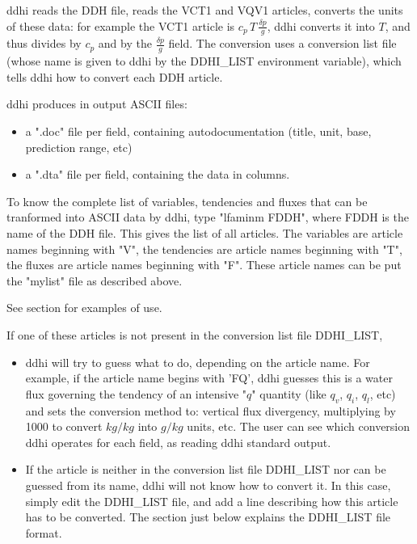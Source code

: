 \p ddhi reads the DDH file, reads the VCT1 and VQV1 articles, converts the units of these data:
for example the VCT1 article is $c_p \, T \, \frac{\delta p}{g}$, ddhi converts it into $T$, and thus divides 
by $c_p$ and by the $\frac{\delta p}{g}$ field. The conversion uses a conversion list file (whose name is given to 
ddhi by the DDHI\_LIST environment variable), which
tells ddhi how to convert each DDH article. 


\p ddhi produces in output ASCII files:
\begin{itemize}
  [label=\textbullet]
  \item a ".doc" file per field, containing autodocumentation (title, unit, base, prediction range, etc)
  \item a ".dta" file per field, containing the data in columns.
\end{itemize}

\p To know the complete list of variables, tendencies and fluxes that can be tranformed into ASCII data
by ddhi, type "lfaminm FDDH", where FDDH is the name of the DDH file.
This gives the list of all articles. The variables are article names beginning with "V",
the tendencies are article names beginning with "T", the fluxes are article names beginning with "F".
These article names can be put the "mylist" file as described above.

\p See section  for examples of use.

\p If one of these articles is not present in the conversion list file DDHI\_LIST, 
\begin{itemize}
  [label=\textbullet]
  \item ddhi will try to guess what to do, depending on the article name. For example, if the article name begins with 'FQ', ddhi guesses this is a water flux governing the tendency of an intensive "$q$" quantity (like $q_v$, $q_i$, $q_l$, etc) and sets the conversion method to: vertical flux divergency, multiplying by 1000 to convert $kg/kg$ into $g/kg$ units, etc. The user can see which conversion ddhi operates for each field, as reading ddhi standard output.
  \item If the article is neither in the conversion list file DDHI\_LIST nor can be guessed from its name, ddhi will not know how to convert it. In this case, simply edit the DDHI\_LIST file, and add a line describing how this article has to be converted. The section just below explains the DDHI\_LIST file format.
\end{itemize}


